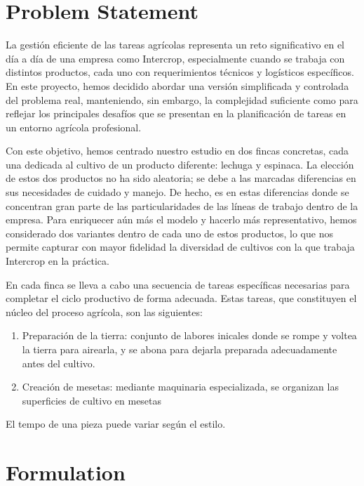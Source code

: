 \chapter*{Problem Statement}
La gestión eficiente de las tareas agrícolas representa un reto significativo en el día a día de una empresa como Intercrop, especialmente cuando se trabaja con distintos productos, cada uno con requerimientos técnicos y logísticos específicos.
En este proyecto, hemos decidido abordar una versión simplificada y controlada del problema real, manteniendo, sin embargo, la complejidad suficiente como para reflejar los principales desafíos que se presentan en la planificación de tareas en un entorno agrícola profesional.

Con este objetivo, hemos centrado nuestro estudio en dos fincas concretas, cada una dedicada al cultivo de un producto diferente: lechuga y espinaca.
La elección de estos dos productos no ha sido aleatoria; se debe a las marcadas diferencias en sus necesidades de cuidado y manejo.
De hecho, es en estas diferencias donde se concentran gran parte de las particularidades de las líneas de trabajo dentro de la empresa.
Para enriquecer aún más el modelo y hacerlo más representativo, hemos considerado dos variantes dentro de cada uno de estos productos, lo que nos permite capturar con mayor fidelidad la diversidad de cultivos con la que trabaja Intercrop en la práctica.

En cada finca se lleva a cabo una secuencia de tareas específicas necesarias para completar el ciclo productivo de forma adecuada. Estas tareas, que constituyen el núcleo del proceso agrícola, son las siguientes:
\begin{enumerate}
    \item Preparación de la tierra: conjunto de labores inicales donde se rompe y voltea la tierra para airearla, y se abona para dejarla preparada adecuadamente antes del cultivo.
    \item Creación de mesetas: mediante maquinaria especializada, se organizan las superficies de cultivo en mesetas 
\end{enumerate}


El \gls{tempo} de una pieza puede variar según el estilo.



\chapter*{Formulation}

